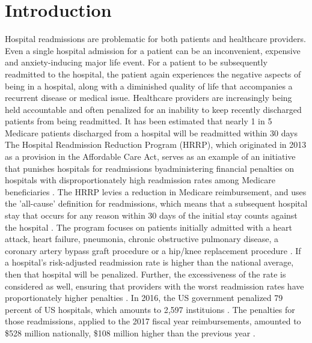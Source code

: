\documentclass[sigconf]{acmart}
\begin{document}

\maketitle

\section{Introduction}

Hospital readmissions are problematic for both patients and healthcare providers. Even a single hospital admission for a patient can be an inconvenient, expensive and anxiety-inducing major life event. For a patient to be subsequently readmitted to the hospital, the patient again experiences the negative aspects of being in a hospital, along with a diminished quality of life that accompanies a recurrent disease or medical issue. Healthcare providers are increasingly being held accountable and often penalized for an inability to keep recently discharged patients from being readmitted. It has been estimated that nearly 1 in 5 Medicare patients discharged from a hospital will be readmitted within 30 days \cite{cite05}
The Hospital Readmission Reduction Program (HRRP), which originated in 2013 as a provision in the Affordable Care Act, serves as an example of an initiative that punishes hospitals for readmissions byadministering financial penalties on hospitals with disproportionately high readmission rates among Medicare beneficiaries \cite{cite06}. The HRRP levies a reduction in Medicare reimbursement, and uses the 'all-cause' definition for readmissions, which means that a subsequent hospital stay that occurs for any reason within 30 days of the initial stay counts against the hospital \cite{cite06}. The program focuses on patients initially admitted with a heart attack, heart failure, pneumonia, chronic obstructive pulmonary disease, a coronary artery bypass graft procedure or a hip/knee replacement procedure \cite{cite06}. If a hospital's risk-adjusted readmission rate is higher than the national average, then that hospital will be penalized. Further, the excessiveness of the rate is considered as well, ensuring that providers with the worst readmission rates have proportionately higher penalties \cite{cite06}. In 2016, the US government penalized 79 percent of US hospitals, which amounts to 2,597 instituions \cite{cite00}. The penalties for those readmissions, applied to the 2017 fiscal year reimbursements, amounted to \$528 million nationally, \$108 million higher than the previous year \cite{cite00}. 
\end{document}
